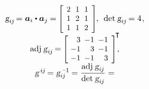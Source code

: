 \begin{otherlanguage}{russian}
\begin{tcolorbox}
\[\begin{array}{c}
\textsl{g}_{i\hspace{-0.1ex}j} \hspace{-0.32ex} = \bm{a}_i \dotp \bm{a}_j \hspace{-0.12ex} = \hspace{-0.16ex}
\scalebox{0.92}[0.92]{$\left[\hspace{-0.16ex}\begin{array}{c@{\hspace{.64em}}c@{\hspace{.64em}}c}
2 & 1 & 1 \\
1 & 2 & 1 \\
1 & 1 & 2
\end{array}\hspace{-0.12ex}\right]$} \hspace{-0.2ex}, \:\:
\determinant \hspace{.12ex} \textsl{g}_{i\hspace{-0.1ex}j} \hspace{-0.25ex} = 4 \hspace{.16ex}, \\
%
\operatorname{adj} \hspace{.12ex} \textsl{g}_{i\hspace{-0.1ex}j} \hspace{-0.25ex} = \hspace{-0.16ex}
\scalebox{0.92}[0.92]{$\left[\hspace{-0.4ex}\begin{array}{r@{\hspace{.5em}}r@{\hspace{.5em}}r}
3 & -1 & -1 \\
-1 & 3 & -1 \\
-1 & -1 & 3
\end{array}\hspace{-0.12ex}\right]^{\hspace{-0.4ex}\scalebox{1.02}{$\T$}}$} \hspace{-0.8ex}, \\
%
\textsl{g}^{\hspace{.32ex}i\hspace{-0.1ex}j} \hspace{-0.25ex} = \textsl{g}_{i\hspace{-0.1ex}j}^{\hspace{.4ex}\expminusone} \hspace{-0.12ex} = \displaystyle \frac{\operatorname{adj} \hspace{.12ex} \textsl{g}_{i\hspace{-0.1ex}j}}{\determinant \hspace{.12ex} \textsl{g}_{i\hspace{-0.1ex}j}} =

\end{array}\]
\end{tcolorbox}
\end{otherlanguage}
